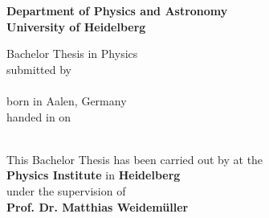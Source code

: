 \begin{titlepage}
\begin{center}
\makeatletter

\Large\textbf{Department of Physics and Astronomy\\
University of Heidelberg}

\vfill

\normalsize
Bachelor Thesis in Physics\\
\normalsize
submitted by\\[0.5cm]
\Large
\textbf{\@author}\\
\normalsize
born in Aalen, Germany\\[0.5cm]
\normalsize
handed in on\\
\Large
\textbf{\@date}\\[0.5cm]
\normalsize


\cleardoublepage
\thispagestyle{empty}


\LARGE\textbf{\@title}

\vfill

\normalsize
This Bachelor Thesis has been carried out by \@author{} at the\\
\textbf{Physics Institute} in \textbf{Heidelberg}\\
under the supervision of\\
\textbf{Prof. Dr. Matthias Weidemüller}

\makeatother
\end{center}
\end{titlepage}
